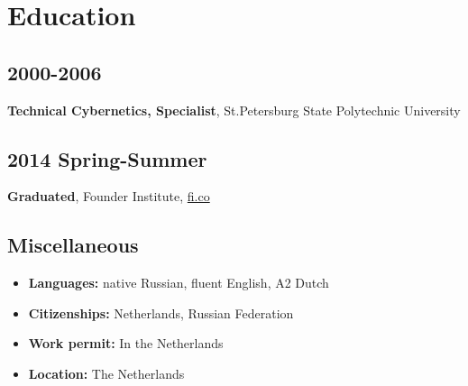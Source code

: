 \section*{Education}

\subsection*{2000-2006}
\textbf{Technical Cybernetics, Specialist}, St.Petersburg State Polytechnic University

\subsection*{2014 Spring-Summer}
\textbf{Graduated}, Founder Institute, \href{https://fi.co}{\url{fi.co}}

\subsection*{Miscellaneous}
\begin{itemize}[noitemsep, nosep]
  \item \textbf{Languages:} native Russian, fluent English, A2 Dutch
  \item \textbf{Citizenships:} Netherlands, Russian Federation
  \item \textbf{Work permit:} In the Netherlands
  \item \textbf{Location:} The Netherlands
\end{itemize}
